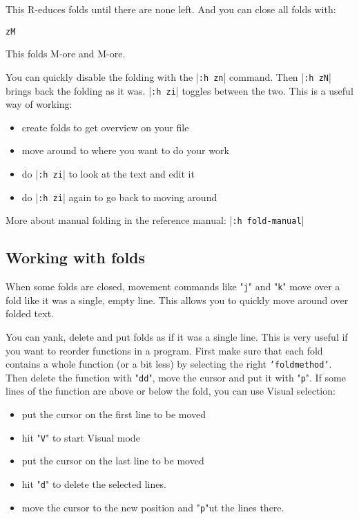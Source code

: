 This R-educes folds until there are none left.
And you can close all folds with:

\begin{Verbatim}[samepage=true]
 zM
\end{Verbatim}

This folds M-ore and M-ore.

You can quickly disable the folding with the |\texttt{:h zn}| command.
Then |\texttt{:h zN}| brings back the folding as it was.
|\texttt{:h zi}| toggles between the two.
This is a useful way of working:

\begin{itemize}
\item create folds to get overview on your file
\item move around to where you want to do your work
\item do |\texttt{:h zi}| to look at the text and edit it
\item do |\texttt{:h zi}| again to go back to moving around
\end{itemize}

More about manual folding in the reference manual: |\texttt{:h fold-manual}|
\subsection{Working with folds}
When some folds are closed, movement commands like "\texttt{j}" and "\texttt{k}" move over a fold like it was a single, empty line.
This allows you to quickly move around over folded text.

You can yank, delete and put folds as if it was a single line.
This is very useful if you want to reorder functions in a program.
First make sure that each fold contains a whole function (or a bit less) by selecting the right \texttt{'foldmethod'}.
Then delete the function with "\texttt{dd}", move the cursor and put it with "\texttt{p}".
If some lines of the function are above or below the fold, you can use Visual selection:

\begin{itemize}
\item put the cursor on the first line to be moved
\item hit "\texttt{V}" to start Visual mode
\item put the cursor on the last line to be moved
\item hit "\texttt{d}" to delete the selected lines.
\item move the cursor to the new position and "\texttt{p}"ut the lines there.
\end{itemize}

